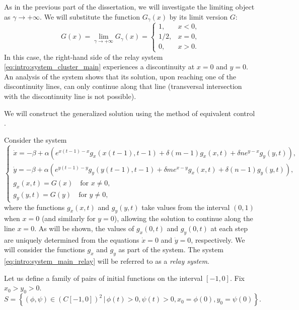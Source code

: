 As in the previous part of the dissertation, we will investigate the limiting object as $\gamma \to +\infty$. We will substitute the function $G_{\gamma} (x)$ by its limit version $G$:
\begin{equation}
	\label{eq:intro:relay_G_tilde}
	G(x) = \lim\limits_{\gamma \to +\infty} G_{\gamma}(x) = 
	\begin{cases}
		1, & x < 0,\\
		1/2, & x = 0,\\
		0, & x > 0.
	\end{cases}
\end{equation}
%
In this case, the right-hand side of the relay system \eqref{eq:intro:system_cluster_main} experiences a discontinuity at $x = 0$ and $y = 0$. An analysis of the system shows that its solution, upon reaching one of the discontinuity lines, can only continue along that line (transversal intersection with the discontinuity line is not possible).

We will construct the generalized solution using the method of equivalent control \cite[\S 4, p. 54]{Filippov1988}.

Consider the system
%
\small
\begin{equation}
	\label{eq:intro:system_main_relay}
	\begin{cases}
		\dot{x} = -\beta + \alpha \left(e^{x(t - 1) - x} g_x(x(t - 1), t - 1) + \delta (m - 1) g_x(x, t) + \delta n e^{y - x} g_y(y, t)\right),\\
		\dot{y} = -\beta + \alpha \left(e^{y(t - 1) - y} g_y(y(t - 1), t - 1) + \delta m e^{x - y} g_x(x, t) + \delta (n - 1) g_y(y, t)\right),\\
		g_x(x, t) = G(x) \quad\text{for } x \neq 0,\\
		g_y(y, t) = G(y) \quad\text{for } y \neq 0,
	\end{cases}
\end{equation}
\normalsize
%
where the functions $g_x(x, t)$ and $g_y(y, t)$ take values from the interval $(0, 1)$ when $x = 0$ (and similarly for $y = 0$), allowing the solution to continue along the line $x = 0$. As will be shown, the values of $g_x(0, t)$ and $g_y(0, t)$ at each step are uniquely determined from the equations $\dot{x} = 0$ and $\dot{y} = 0$, respectively. We will consider the functions $g_x$ and $g_y$ as part of the system.
The system \eqref{eq:intro:system_main_relay} will be referred to as a \emph{relay system}.

Let us define a family of pairs of initial functions on the interval $[-1, 0]$. Fix $x_0 > y_0 > 0$.
\begin{equation}
	\label{eq:intro:initial_set}
	S = \left\{(\phi, \psi) \in (C[-1, 0])^2 \,|\, \phi(t) > 0, \psi(t) > 0, x_0 = \phi(0), y_0 = \psi(0)\right\}.
\end{equation}

